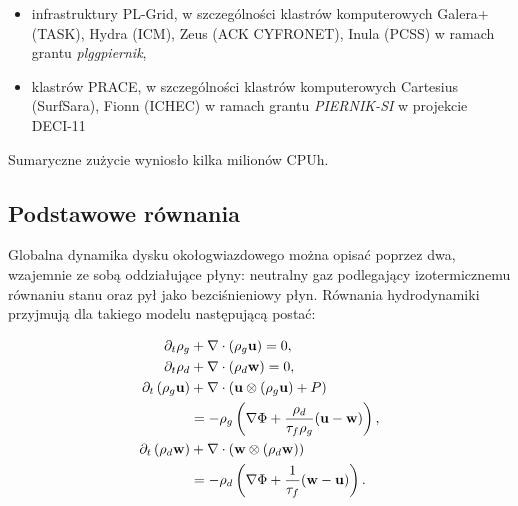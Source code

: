 \begin{itemize}
   \item infrastruktury PL-Grid, w szczególności klastrów
      komputerowych Galera+ (TASK), Hydra (ICM), Zeus (ACK CYFRONET), Inula
      (PCSS) w ramach grantu \emph{plggpiernik},
   \item klastrów PRACE, w szczególności klastrów komputerowych
      Cartesius (SurfSara), Fionn (ICHEC) w ramach grantu \emph{PIERNIK-SI} w
      projekcie DECI-11
\end{itemize}
Sumaryczne zużycie wyniosło kilka milionów CPUh.




\subsection{Podstawowe równania}
Globalna dynamika dysku okołogwiazdowego można opisać poprzez dwa, wzajemnie ze
sobą oddziałujące płyny: neutralny gaz podlegający izotermicznemu równaniu
stanu oraz pył jako bezciśnieniowy płyn. Równania hydrodynamiki przyjmują dla
takiego modelu następującą postać:

\begin{align}
\partial_t \rho_g &+ \nabla\cdot\left(\rho_g\mathbf{u}\right) = 0,\\
\partial_t \rho_d &+ \nabla\cdot\left(\rho_d\mathbf{w}\right) = 0,\\
\partial_t \left(\rho_g\mathbf{u}\right) &+
   \nabla\cdot(\mathbf{u}\otimes(\rho_g\mathbf{u})+P) \notag\\
 &= -\rho_g\left(\nabla\Phi +
\frac{\rho_d}{\tau_f\rho_g}(\mathbf{u}-\mathbf{w})\right),\label{eq3}\\
\partial_t \left(\rho_d\mathbf{w}\right) &+
\nabla\cdot(\mathbf{w}\otimes(\rho_d\mathbf{w})) \notag\\
 &= -\rho_d\left(\nabla\Phi + \frac{1}{\tau_f}(\mathbf{w}-\mathbf{u})\right)
\label{eq4}.
\end{align}

